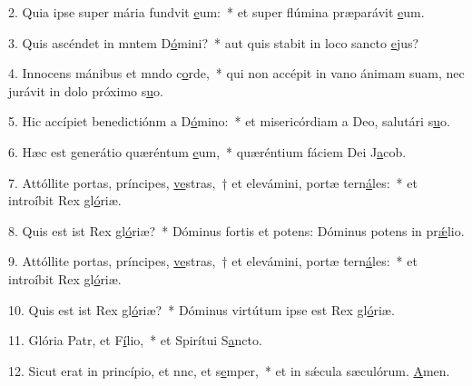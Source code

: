 2. Quia ipse super mária fundvit \uline{e}um:~* et super flúmina præparávit \uline{e}um.\par 
3. Quis ascéndet in mntem D\uline{ó}mini?~* aut quis stabit in loco sancto \uline{e}jus?\par 
4. Innocens mánibus et mndo c\uline{o}rde,~* qui non accépit in vano ánimam suam, nec jurávit in dolo próximo s\uline{u}o.\par 
5. Hic accípiet benedictiónm a D\uline{ó}mino:~* et misericórdiam a Deo, salutári s\uline{u}o.\par 
6. Hæc est generátio quæréntum \uline{e}um,~* quæréntium fáciem Dei J\uline{a}cob.\par 
7. Attóllite portas, príncipes, \uline{ve}stras,~† et elevámini, portæ tern\uline{á}les:~* et introíbit Rex gl\uline{ó}riæ.\par 
8. Quis est ist Rex gl\uline{ó}riæ?~* Dóminus fortis et potens: Dóminus potens in pr\uline{ǽ}lio.\par 
9. Attóllite portas, príncipes, \uline{ve}stras,~† et elevámini, portæ tern\uline{á}les:~* et introíbit Rex gl\uline{ó}riæ.\par 
10. Quis est ist Rex gl\uline{ó}riæ?~* Dóminus virtútum ipse est Rex gl\uline{ó}riæ.\par 
11. Glória Patr, et F\uline{í}lio,~* et Spirítui S\uline{a}ncto.\par 
12. Sicut erat in princípio, et nnc, et s\uline{e}mper,~* et in sǽcula sæculórum. \uline{A}men.\par 
